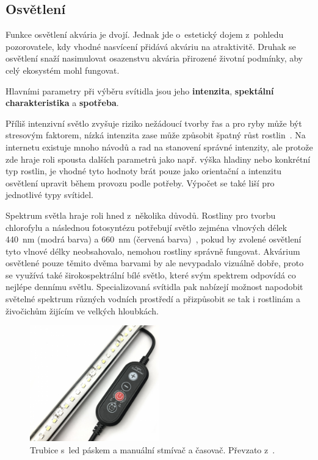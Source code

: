     \subsection{Osvětlení}
        Funkce osvětlení akvária je dvojí. Jednak jde o~estetický dojem z~pohledu pozorovatele, kdy vhodné nasvícení přidává akváriu na atraktivitě. Druhak se osvětlení snaží nasimulovat osazenstvu akvária přirozené životní podmínky, aby celý ekosystém mohl fungovat.

        Hlavními parametry při výběru svítidla jsou jeho \textbf{intenzita}, \textbf{spektální charakteristika} a \textbf{spotřeba}. 
        
        Příliš intenzivní světlo zvyšuje riziko nežádoucí tvorby řas a pro ryby může být stresovým faktorem, nízká intenzita zase může způsobit špatný růst rostlin~\cite{KejzlarRadim2022Ařpa}. Na internetu existuje mnoho návodů a rad na stanovení správné intenzity, ale protože zde hraje roli spousta dalších parametrů jako např. výška hladiny nebo konkrétní typ rostlin, je vhodné tyto hodnoty brát pouze jako orientační a intenzitu osvětlení upravit během provozu podle potřeby. Výpočet se také liší pro jednotlivé typy svítidel. 

        Spektrum světla hraje roli hned z~několika důvodů. Rostliny pro tvorbu chlorofylu a následnou fotosyntézu potřebují světlo zejména vlnových délek \qty{440}{nm} (modrá barva) a \qty{660}{nm} (červená barva)~\cite{eshop-ledsolution-svetlo}, pokud by zvolené osvětlení tyto vlnové délky neobsahovalo, nemohou rostliny správně fungovat. Akvárium osvětlené pouze těmito dvěma barvami by ale nevypadalo vizuálně dobře, proto se využívá také širokospektrální bílé světlo, které svým spektrem odpovídá co nejlépe dennímu světlu. 
        Specializovaná svítidla pak nabízejí možnost napodobit světelné spektrum různých vodních prostředí a přizpůsobit se tak i rostlinám a živočichům žijícím ve velkých hloubkách. 

 
        \begin{figure}[h!]
            \centering
            \includegraphics[width=0.5\textwidth]{obrazky/osvetleni/stmivac.jpg}
            \caption{Trubice s~\acs{led} páskem a manuální stmívač a časovač. Převzato z~\cite{eshop-rostlinna-akvaria}.}
            \label{fig:obrazky-osvetleni-stmivac-jpg}
        \end{figure}

